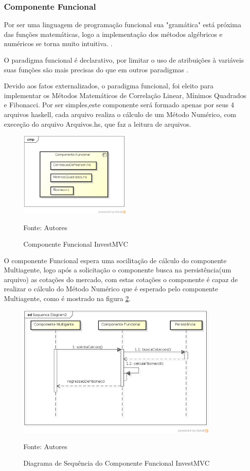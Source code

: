 \subsubsection{Componente Funcional}
Por ser uma linguagem de programação funcional sua "gramática" está próxima das funções matemáticas, logo a implementação dos métodos algébricos e numéricos se torna muito intuitiva. \cite{hoogle2013}.

O paradigma funcional é declarativo, por limitar o uso de atribuições à variáveis suas funções são mais precisas do que em outros paradigmas \cite{piponi2006}.

Devido aos fatos externalizados, o paradigma funcional, foi eleito para implementar os Métodos Matemáticos de Correlação Linear, Mínimos Quadrados e Fibonacci. Por ser simples,este componente será formado apenas por seus 4 arquivos haskell, cada arquivo realiza o cálculo de um Método Numérico, com execeção do arquivo  Arquivos.hs, que faz a leitura de arquivos.

\begin{figure}[htp]
\centering
\includegraphics[width=0.5\textwidth]{figuras/componenteFuncional}
\caption{Componente Funcional InvestMVC}{Fonte: Autores} 
\label{componenteFuncional}
\end{figure}

O componente Funcional espera uma socilitação de cálculo do componente Multiagente, logo após a solicitação o componente busca na persistência(um arquivo) as cotações do mercado, com estas cotações o componente é capaz de realizar o cálculo do Método Numérico que é esperado pelo componente Multiagente, como é mostrado na figura \ref{sequenciaFuncional}.

\begin{figure}[htp]
\centering
\includegraphics[width=0.9\textwidth]{figuras/sequenciaFuncional}
\caption{Diagrama de Sequência do Componente Funcional InvestMVC}{Fonte: Autores} 
\label{sequenciaFuncional}
\end{figure}

